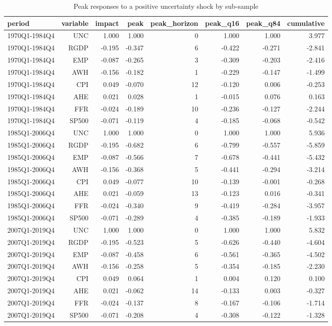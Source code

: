 \begin{table}[htbp]
\centering
\caption{Peak responses to a positive uncertainty shock by sub-sample}
\label{tab:peakper}
\begin{tabular}{lrrrrrrr}
\toprule
period & variable & impact & peak & peak\_horizon & peak\_q16 & peak\_q84 & cumulative \\
\midrule
1970Q1-1984Q4 & UNC & 1.000 & 1.000 & 0 & 1.000 & 1.000 & 3.977 \\
1970Q1-1984Q4 & RGDP & -0.195 & -0.347 & 6 & -0.422 & -0.271 & -2.841 \\
1970Q1-1984Q4 & EMP & -0.087 & -0.265 & 3 & -0.309 & -0.203 & -2.416 \\
1970Q1-1984Q4 & AWH & -0.156 & -0.182 & 1 & -0.229 & -0.147 & -1.499 \\
1970Q1-1984Q4 & CPI & 0.049 & -0.070 & 12 & -0.120 & 0.006 & -0.253 \\
1970Q1-1984Q4 & AHE & 0.021 & 0.028 & 1 & -0.015 & 0.076 & 0.163 \\
1970Q1-1984Q4 & FFR & -0.024 & -0.189 & 10 & -0.236 & -0.127 & -2.244 \\
1970Q1-1984Q4 & SP500 & -0.071 & -0.119 & 4 & -0.185 & -0.068 & -0.542 \\
1985Q1-2006Q4 & UNC & 1.000 & 1.000 & 0 & 1.000 & 1.000 & 5.936 \\
1985Q1-2006Q4 & RGDP & -0.195 & -0.682 & 6 & -0.799 & -0.557 & -5.859 \\
1985Q1-2006Q4 & EMP & -0.087 & -0.566 & 7 & -0.678 & -0.441 & -5.432 \\
1985Q1-2006Q4 & AWH & -0.156 & -0.368 & 5 & -0.441 & -0.294 & -3.214 \\
1985Q1-2006Q4 & CPI & 0.049 & -0.077 & 10 & -0.139 & -0.001 & -0.268 \\
1985Q1-2006Q4 & AHE & 0.021 & -0.059 & 13 & -0.123 & 0.016 & -0.341 \\
1985Q1-2006Q4 & FFR & -0.024 & -0.340 & 9 & -0.419 & -0.284 & -3.957 \\
1985Q1-2006Q4 & SP500 & -0.071 & -0.289 & 4 & -0.385 & -0.189 & -1.933 \\
2007Q1-2019Q4 & UNC & 1.000 & 1.000 & 0 & 1.000 & 1.000 & 5.832 \\
2007Q1-2019Q4 & RGDP & -0.195 & -0.523 & 5 & -0.626 & -0.440 & -4.604 \\
2007Q1-2019Q4 & EMP & -0.087 & -0.458 & 6 & -0.561 & -0.365 & -4.502 \\
2007Q1-2019Q4 & AWH & -0.156 & -0.258 & 5 & -0.354 & -0.185 & -2.230 \\
2007Q1-2019Q4 & CPI & 0.049 & 0.064 & 1 & 0.004 & 0.120 & 0.100 \\
2007Q1-2019Q4 & AHE & 0.021 & -0.062 & 14 & -0.133 & 0.003 & -0.327 \\
2007Q1-2019Q4 & FFR & -0.024 & -0.137 & 8 & -0.167 & -0.106 & -1.714 \\
2007Q1-2019Q4 & SP500 & -0.071 & -0.208 & 4 & -0.308 & -0.122 & -1.328 \\
\bottomrule
\end{tabular}
\end{table}